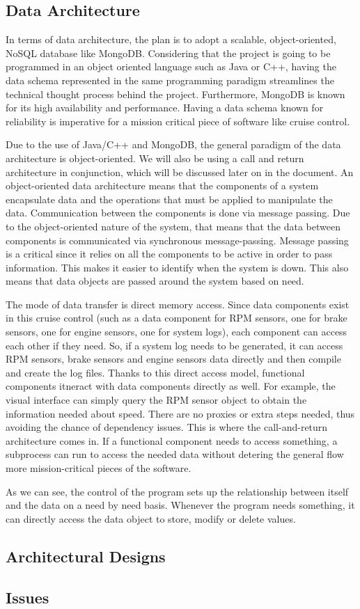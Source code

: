 \documentclass[preprint,11pt,3p]{article}
\begin{document}
\subsection{Data Architecture} 
In terms of data architecture, the plan is to adopt a scalable, object-oriented, NoSQL database like MongoDB. Considering that the project is going to be programmed in an object oriented language such as Java or C++, having the data schema represented in the same programming paradigm streamlines the technical thought process behind the project. Furthermore, MongoDB is known for its high availability and performance. Having a data schema known for reliability is imperative for a mission critical piece of software like cruise control.\par
Due to the use of Java/C++ and MongoDB, the general paradigm of the data architecture is object-oriented. We will also be using a call and return architecture in conjunction, which will be discussed later on in the document.  An object-oriented data architecture means that the components of a system encapsulate data and the operations that must be applied to manipulate the data. Communication between the components is done via message passing. Due to the object-oriented nature of the system, that means that the data between components is communicated via synchronous message-passing. Message passing is a critical since it relies on all the components to be active in order to pass information. This makes it easier to identify when the system is down. This also means that data objects are passed around the system based on need. \par
The mode of data transfer is direct memory access. Since data components exist in this cruise control (such as a data component for RPM sensors, one for brake sensors, one for engine sensors, one for system logs), each component can access each other if they need. So, if a system log needs to be generated, it can access RPM sensors, brake sensors and engine sensors data directly and then compile and create the log files. Thanks to this direct access model, functional components itneract with data components directly as well. For example, the visual interface can simply query the RPM sensor object to obtain the information needed about speed. There are no proxies or extra steps needed, thus avoiding the chance of dependency issues. This is where the call-and-return architecture comes in. If a functional component needs to access something, a subprocess can run to access the needed data without detering the general flow more mission-critical pieces of the software. \par 
As we can see, the control of the program sets up the relationship between itself and the data on a need by need basis. Whenever the program needs something, it can directly access the data object to store, modify or delete values. 

\subsection{Architectural Designs} 
\subsection{Issues}
\end{document}
